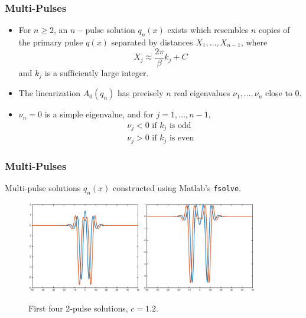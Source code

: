 \documentclass[16pt]{beamer}
\begin{document}
\begin{frame}
\frametitle{Multi-Pulses}   
    \begin{theorem}[Sandstede, 1997]
    \begin{itemize}
	   	\item For $n \geq 2$, an $n-$pulse solution $q_n(x)$ exists which resembles $n$ copies of the primary pulse $q(x)$ separated by distances $X_1, \dots, X_{n-1}$, where 
	    \[ X_j \approx \frac{2 \pi}{\beta} k_j + C \]
	    and $k_j$ is a sufficiently large integer.

    	\item The linearization $A_0(q_n)$ has precisely $n$ real eigenvalues $\nu_1, \dots, \nu_n$ close to 0. 

    	\item $\nu_n = 0$ is a simple eigenvalue, and for $j = 1, \dots, n-1$,
        \begin{align*}
            \nu_j < 0 \text{ if } k_j \text{ is odd} \\
            \nu_j > 0 \text{ if } k_j \text{ is even} 
        \end{align*}
    \end{itemize}
    \end{theorem}
\end{frame}

\begin{frame}
\frametitle{Multi-Pulses} 
    Multi-pulse solutions $q_n(x)$ constructed using Matlab's \texttt{fsolve}.
    \begin{figure}
    \begin{center}
    \includegraphics[width=5cm]{images/double12_12.eps}
    \includegraphics[width=5cm]{images/double12_34.eps}
    \caption{First four 2-pulse solutions, $c = 1.2$.}
    \end{center}
    \end{figure}
\end{frame}
\end{document}
